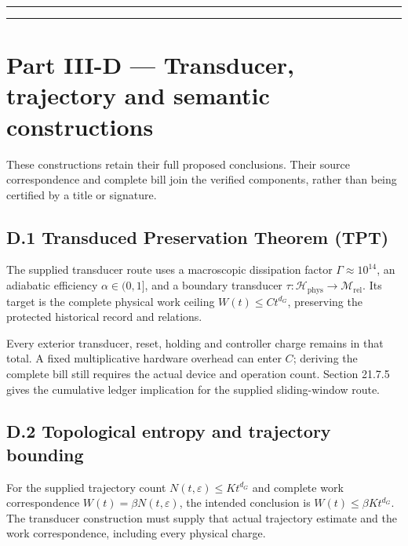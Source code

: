 \documentclass[
]{article}
\begin{document}
\begin{center}\rule{0.5\linewidth}{0.5pt}\end{center}

\begin{center}\rule{0.5\linewidth}{0.5pt}\end{center}

\section{Part III-D --- Transducer, trajectory and semantic
constructions}\label{part-iii-d-transducer-trajectory-and-semantic-constructions}

These constructions retain their full proposed conclusions. Their source
correspondence and complete bill join the verified components, rather
than being certified by a title or signature.

\subsection{D.1 Transduced Preservation Theorem
(TPT)}\label{d.1-transduced-preservation-theorem-tpt}

The supplied transducer route uses a macroscopic dissipation factor
\(\Gamma\approx10^{14}\), an adiabatic efficiency \(\alpha\in(0,1]\),
and a boundary transducer
\(\tau:\mathcal H_{\mathrm{phys}}\to\mathcal M_{\mathrm{rel}}\). Its
target is the complete physical work ceiling \(W(t)\le Ct^{d_G}\),
preserving the protected historical record and relations.

Every exterior transducer, reset, holding and controller charge remains
in that total. A fixed multiplicative hardware overhead can enter \(C\);
deriving the complete bill still requires the actual device and
operation count. Section 21.7.5 gives the cumulative ledger implication
for the supplied sliding-window route.

\subsection{D.2 Topological entropy and trajectory
bounding}\label{d.2-topological-entropy-and-trajectory-bounding}

For the supplied trajectory count \(N(t,\varepsilon)\le Kt^{d_G}\) and
complete work correspondence \(W(t)=\beta N(t,\varepsilon)\), the
intended conclusion is \(W(t)\le\beta Kt^{d_G}\). The transducer
construction must supply that actual trajectory estimate and the work
correspondence, including every physical charge.
\end{document}

